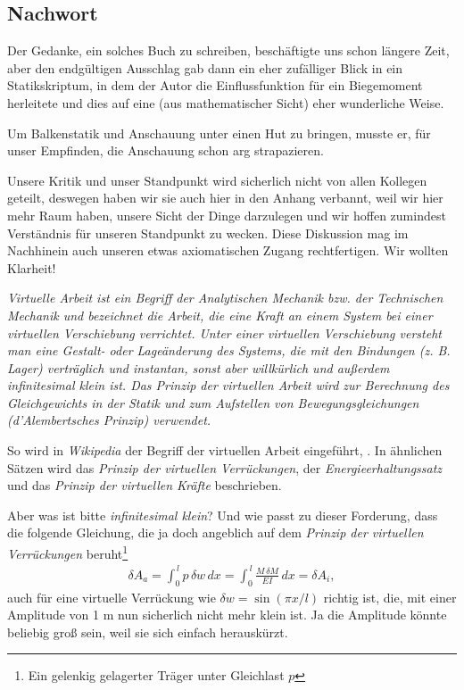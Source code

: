 \textcolor{chapterTitleBlue}{\chapter{Nachwort }}
Der Gedanke, ein solches Buch zu schreiben, besch\"{a}ftigte uns schon l\"{a}ngere Zeit, aber den endg\"{u}ltigen Ausschlag gab dann ein eher zuf\"{a}lliger Blick in ein Statikskriptum, in dem der Autor die Einflussfunktion f\"{u}r ein Biegemoment herleitete und dies auf eine (aus mathematischer Sicht) eher wunderliche Weise.

Um Balkenstatik und Anschauung unter einen Hut zu bringen, musste er, f\"{u}r unser Empfinden, die Anschauung schon arg strapazieren.

Unsere Kritik und unser Standpunkt wird sicherlich nicht von allen Kollegen geteilt, deswegen haben wir sie auch hier in den Anhang verbannt, weil wir hier mehr Raum haben, unsere Sicht der Dinge darzulegen und wir hoffen zumindest Verst\"{a}ndnis f\"{u}r unseren Standpunkt zu wecken. Diese Diskussion mag im Nachhinein auch unseren etwas axiomatischen Zugang rechtfertigen. Wir wollten Klarheit!

{\em Virtuelle Arbeit ist ein Begriff der Analytischen Mechanik bzw. der Technischen Mechanik und bezeichnet die Arbeit, die eine Kraft an einem System bei einer virtuellen Verschiebung verrichtet. Unter einer virtuellen Verschiebung versteht man eine Gestalt- oder Lage\"{a}nderung des Systems, die mit den Bindungen (z. B. Lager) vertr\"{a}glich und \glq instantan\grq{}, sonst aber willk\"{u}rlich und au{\ss}erdem infinitesimal klein ist. Das Prinzip der virtuellen Arbeit wird zur Berechnung des Gleichgewichts in der Statik und zum Aufstellen von Bewegungsgleichungen (d'Alembertsches Prinzip) verwendet.\/}

So wird in {\em Wikipedia\/} der Begriff der virtuellen Arbeit eingef\"{u}hrt, \cite{VA}. In \"{a}hnlichen S\"{a}tzen wird das {\em Prinzip der virtuellen Verr\"{u}ckungen\/}, der {\em Energieerhaltungssatz\/} und das {\em Prinzip der virtuellen Kr\"{a}fte\/} beschrieben.

Aber was ist bitte {\em \glq infinitesimal klein\grq{}\/}? Und wie passt zu dieser Forderung, dass die folgende Gleichung, die ja doch angeblich auf dem {\em Prinzip der virtuellen Verr\"{u}ckungen\/} beruht\footnote{Ein gelenkig gelagerter Tr\"{a}ger unter Gleichlast $p$}
\begin{align}\label{Eq82}
\delta A_a = \int_0^{\,l} p\,\delta w\,dx = \int_0^{\,l} \frac{M\,\delta M}{EI} \,dx = \delta A_i,
\end{align}
auch f\"{u}r eine virtuelle Verr\"{u}ckung wie $\delta w = \sin (\pi x/l)$ richtig ist, die, mit einer Amplitude von 1 m nun sicherlich nicht mehr klein ist. Ja die Amplitude k\"{o}nnte beliebig gro{\ss} sein, weil sie sich einfach herausk\"{u}rzt.

